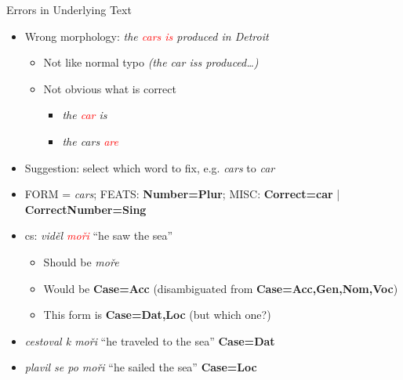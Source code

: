 \documentclass[10pt, compress, aspectratio=169]{beamer}
\newcommand{\feat}[1]{\textbf{\footnotesize\color{red}#1}}
\begin{document}
\begin{frame}{Errors in Underlying Text}
\begin{itemize}
\item Wrong morphology: \textit{the \textcolor{red}{cars is} produced in Detroit}
  \begin{itemize}
  \item<2-> Not like normal typo \textit{(the car iss produced\dots{})}
  \item<3-> Not obvious what is correct
    \begin{itemize}
    \item \textit{the \textcolor{red}{car} is}
    \item \textit{the cars \textcolor{red}{are}}
    \end{itemize}
  \end{itemize}
\item<4-> Suggestion: select which word to fix, e.g. \textit{cars} to \textit{car}
\item<4-> FORM = \textit{cars}; FEATS: \feat{Number=Plur}; MISC: \feat{Correct=car} | \feat{CorrectNumber=Sing}
\item<5-> cs: \textit{viděl \textcolor{red}{moři}} ``he saw the sea''
  \begin{itemize}
  \item Should be \textit{moře}
  \item Would be \feat{Case=Acc} (disambiguated from \feat{Case=Acc,Gen,Nom,Voc})
  \item This form is \feat{Case=Dat,Loc} (but which one?)
  \end{itemize}
\item<5-> \textit{cestoval k moři} ``he traveled to the sea'' \feat{Case=Dat}
\item<5-> \textit{plavil se po moři} ``he sailed the sea'' \feat{Case=Loc}
\end{itemize}
\end{frame}
\end{document}
